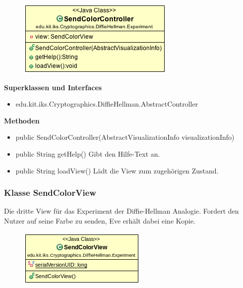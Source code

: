 \documentclass{article}
\begin{document}
      \begin{figure}[H]
        \centering
        \includegraphics{resources/edu-kit-iks-Cryptographics-DiffieHellman-Experiment-SendColorController}
      \end{figure}

      \textbf{Superklassen und Interfaces}
      \begin{itemize}
        \item edu.kit.iks.Cryptographics.DiffieHellman.AbstractController
      \end{itemize}

      \textbf{Methoden}
      \begin{itemize}
          \item public SendColorController(AbstractVisualizationInfo visualizationInfo)
        \item public String getHelp() \newline
        Gibt den Hilfe-Text an.
        \item public String loadView() \newline
        Lädt die View zum zugehörigen Zustand.
      \end{itemize}

\subsubsection{Klasse SendColorView}
      Die dritte View für das Experiment der Diffie-Hellman Analogie.
      Fordert den Nutzer auf seine Farbe zu senden, Eve erhält dabei eine Kopie.

      \begin{figure}[H]
        \centering
        \includegraphics{resources/edu-kit-iks-Cryptographics-DiffieHellman-Experiment-SendColorView}
      \end{figure}
\end{document}
